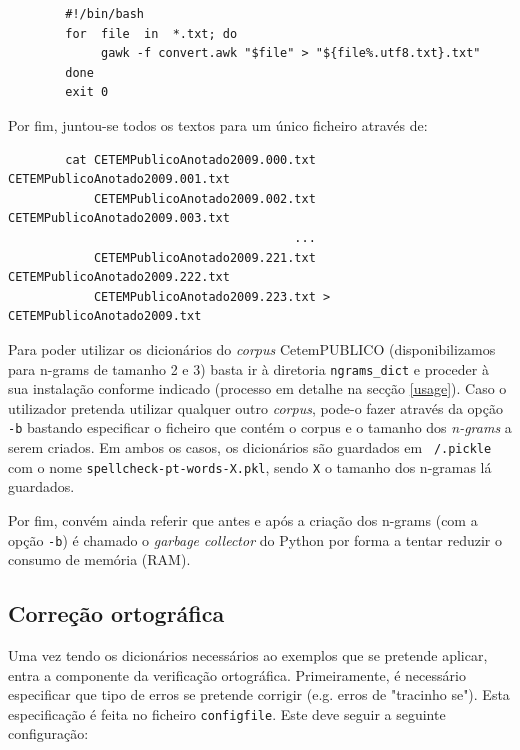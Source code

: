 \documentclass{article}
\begin{document}
\begin{verbatim}
        #!/bin/bash
        for  file  in  *.txt; do
             gawk -f convert.awk "$file" > "${file%.utf8.txt}.txt"
        done
        exit 0
\end{verbatim}

Por fim, juntou-se todos os textos para um único ficheiro através de:

\begin{verbatim}
        cat CETEMPublicoAnotado2009.000.txt CETEMPublicoAnotado2009.001.txt 
            CETEMPublicoAnotado2009.002.txt CETEMPublicoAnotado2009.003.txt 
                                        ... 
            CETEMPublicoAnotado2009.221.txt CETEMPublicoAnotado2009.222.txt 
            CETEMPublicoAnotado2009.223.txt > CETEMPublicoAnotado2009.txt
\end{verbatim}

Para poder utilizar os dicionários do \textit{corpus} CetemPUBLICO (disponibilizamos para n-grams de tamanho 2 e 3) basta ir à diretoria \texttt{ngrams\_dict} e proceder à sua instalação conforme indicado (processo em detalhe na secção \ref{usage}). Caso o utilizador pretenda utilizar qualquer outro \textit{corpus}, pode-o fazer através da opção \texttt{-b} bastando especificar o ficheiro que contém o corpus e o tamanho dos \textit{n-grams} a serem criados. Em ambos os casos, os dicionários são guardados em \texttt{~/.pickle} com o nome \texttt{spellcheck-pt-words-X.pkl}, sendo \texttt{X} o tamanho dos n-gramas lá guardados.

Por fim, convém ainda referir que antes e após a criação dos n-grams (com a opção \texttt{-b}) é chamado o \textit{garbage collector} do Python por forma a tentar reduzir o consumo de memória (RAM).


\subsection{Correção ortográfica}
Uma vez tendo os dicionários necessários ao exemplos que se pretende aplicar, entra a componente da verificação ortográfica. Primeiramente, é necessário especificar que tipo de erros se pretende corrigir (e.g. erros de "tracinho se"). Esta especificação é feita no ficheiro \texttt{configfile}. Este deve seguir a seguinte configuração: 
\end{document}
